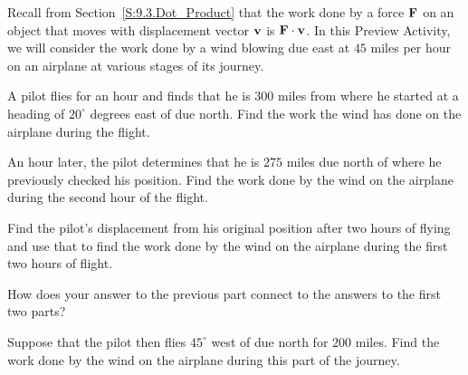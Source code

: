 \begin{pa} \label{PA:12.2}
Recall from Section~\ref{S:9.3.Dot_Product} that the work done by a
force $\mathbf{F}$ on an object that moves with displacement vector $\mathbf{v}$ is
$\mathbf{F}\cdot \mathbf{v}$. In this Preview Activity, we will consider the work
done by a wind blowing due east at $45$ miles per hour on an airplane
at various stages of its journey.
\ba
\item A pilot flies for an hour and finds that he is $300$ miles from
  where he started at a heading of $20^\circ$ degrees east of due
  north. Find the work the wind has done on the airplane during the
  flight.
\item An hour later, the pilot determines that he is $275$ miles due
  north of where he previously checked his position. Find the work
  done by the wind on the airplane during the second hour of the
  flight.
\item Find the pilot's displacement from his original position after
  two hours of flying and use that to find the work done by the wind
  on the airplane during the first two hours of flight.
\item How does your answer to the previous part connect to the answers
  to the first two parts?
\item Suppose that the pilot then flies $45^\circ$ west of due north
  for $200$ miles. Find the work done by the wind on the airplane
  during this part of the journey.
\ea
\end{pa} 
\afterpa 
